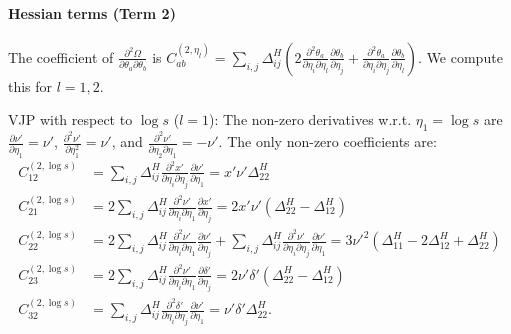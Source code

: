 \documentclass{article}
\begin{document}
\paragraph{Hessian terms (Term 2)}

The coefficient of $\frac{\partial^2 \Omega}{\partial \theta_a \partial \theta_b}$ is $C^{(2,\eta_l)}_{ab} = \sum_{i,j} \Delta^H_{ij} ( 2 \frac{\partial^2 \theta_a}{\partial \eta_i \partial \eta_l} \frac{\partial \theta_b}{\partial \eta_j} + \frac{\partial^2 \theta_a}{\partial \eta_i \partial \eta_j} \frac{\partial \theta_b}{\partial \eta_l} )$.
We compute this for $l=1,2$.

VJP with respect to $\log s$ ($l=1$):
The non-zero derivatives w.r.t. $\eta_1 = \log s$ are $\frac{\partial\nu'}{\partial\eta_1}=\nu'$, $\frac{\partial^2\nu'}{\partial\eta_1^2}=\nu'$, and $\frac{\partial^2\nu'}{\partial\eta_2\partial\eta_1}=-\nu'$.
The only non-zero coefficients are:
%
\begin{align}
  C^{(2,\log s)}_{12} & = \sum_{i,j} \Delta^H_{ij} \frac{\partial^2 x'}{\partial\eta_i\partial\eta_j} \frac{\partial \nu'}{\partial\eta_1} = x'\nu' \Delta^H_{22}                                                                                                                                                     \\
  C^{(2,\log s)}_{21} & = 2 \sum_{i,j} \Delta^H_{ij} \frac{\partial^2 \nu'}{\partial\eta_i\partial\eta_1} \frac{\partial x'}{\partial\eta_j} = 2x'\nu'(\Delta^H_{22} - \Delta^H_{12})                                                                                                                                 \\
  C^{(2,\log s)}_{22} & = 2 \sum_{i,j} \Delta^H_{ij} \frac{\partial^2\nu'}{\partial\eta_i\partial\eta_1} \frac{\partial\nu'}{\partial\eta_j} + \sum_{i,j} \Delta^H_{ij} \frac{\partial^2\nu'}{\partial\eta_i\partial\eta_j} \frac{\partial\nu'}{\partial\eta_1} = 3\nu'^2(\Delta^H_{11}-2\Delta^H_{12}+\Delta^H_{22}) \\
  C^{(2,\log s)}_{23} & = 2 \sum_{i,j} \Delta^H_{ij} \frac{\partial^2\nu'}{\partial\eta_i\partial\eta_1} \frac{\partial\delta'}{\partial\eta_j} = 2\nu'\delta'(\Delta^H_{22} - \Delta^H_{12})                                                                                                                         \\
  C^{(2,\log s)}_{32} & = \sum_{i,j} \Delta^H_{ij} \frac{\partial^2 \delta'}{\partial\eta_i\partial\eta_j} \frac{\partial \nu'}{\partial\eta_1} = \nu'\delta' \Delta^H_{22}.
\end{align}
\end{document}

